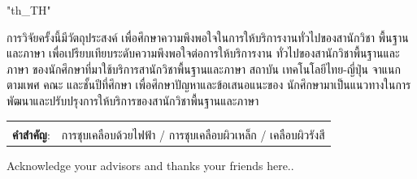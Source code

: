 \documentclass[12pt,oneside,openright,a4paper]{cpe-english-project}
\begin{document}
{
\XeTeXlinebreaklocale "th_TH"	
\thaifont
\thaiabstract

การวิจัยครั้งนี้มีวัตถุประสงค์  เพื่อศึกษาความพึงพอใจในการให้บริการงานทั่วไปของสานักวิชา พื้นฐานและภาษา เพื่อเปรียบเทียบระดับความพึงพอใจต่อการให้บริการงาน ทั่วไปของสานักวิชาพื้นฐานและภาษา ของนักศึกษาที่มาใช้บริการสานักวิชาพื้นฐานและภาษา สถาบัน เทคโนโลยีไทย-ญี่ปุ่น จาแนกตามเพศ คณะ และชั้นปีที่ศึกษา เพื่อศึกษาปัญหาและข้อเสนอแนะของ นักศึกษามาเป็นแนวทางในการพัฒนาและปรับปรุงการให้บริการของสานักวิชาพื้นฐานและภาษา

\begin{flushleft}
\begin{tabular*}{\textwidth}{@{}lp{}}
 & \\

\textbf{คำสำคัญ}: & การชุบเคลือบด้วยไฟฟ้า / การชุบเคลือบผิวเหล็ก /  เคลือบผิวรังสี
\end{tabular*}
\end{flushleft}
\endabstract
}

\preface
Acknowledge your advisors and thanks your friends here..

\tableofcontents                    
\listoftables
\listoffigures                      
\end{document}
